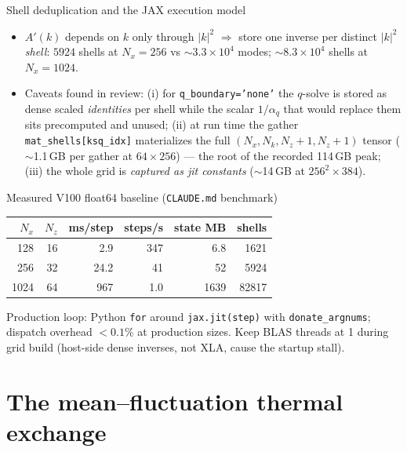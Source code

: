 \documentclass[aspectratio=169,10pt]{beamer}
\newcommand{\file}[1]{\textcolor{blue!60!black}{\texttt{#1}}}
\begin{document}
\begin{frame}{Shell deduplication and the JAX execution model}
  \begin{itemize}
    \item $A'(k)$ depends on $k$ only through $|k|^2$ $\Rightarrow$ store one inverse
      per distinct $|k|^2$ \emph{shell}: $5924$ shells at $N_x{=}256$ vs
      $\sim3.3\times10^4$ modes; $\sim8.3\times10^4$ shells at $N_x{=}1024$.
    \item Caveats found in review:
      (i) for \texttt{q\_boundary='none'} the $q$-solve is stored as dense scaled
      \emph{identities} per shell while the scalar $1/\alpha_q$ that would replace
      them sits precomputed and unused;
      (ii) at run time the gather \texttt{mat\_shells[ksq\_idx]} materializes the
      full $(N_x,N_k,N_z{+}1,N_z{+}1)$ tensor ($\sim$1.1\,GB per gather at
      $64{\times}256$) --- the root of the recorded 114\,GB peak;
      (iii) the whole grid is \emph{captured as jit constants}
      ($\sim$14\,GB at $256^2{\times}384$).
  \end{itemize}
  \begin{block}{Measured V100 float64 baseline (\file{CLAUDE.md} benchmark)}
    \scriptsize
    \begin{tabular}{@{}rrrrrr@{}}
      \toprule
      $N_x$ & $N_z$ & ms/step & steps/s & state MB & shells \\
      \midrule
      128 & 16 & 2.9 & 347 & 6.8 & 1621 \\
      256 & 32 & 24.2 & 41 & 52 & 5924 \\
      1024 & 64 & 967 & 1.0 & 1639 & 82817 \\
      \bottomrule
    \end{tabular}
    \quad\parbox[b]{0.42\textwidth}{\scriptsize Production loop: Python \texttt{for} around
    \texttt{jax.jit(step)} with \texttt{donate\_argnums}; dispatch overhead
    $<0.1\%$ at production sizes. Keep BLAS threads at 1 during grid build
    (host-side dense inverses, not XLA, cause the startup stall).}
  \end{block}
\end{frame}

\section{The mean--fluctuation thermal exchange}
\end{document}

